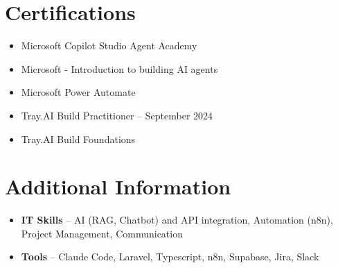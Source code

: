 \documentclass[a4paper,10pt]{article}
\begin{document}
\section{Certifications}
\begin{itemize}
\item Microsoft Copilot Studio Agent Academy
\item Microsoft - Introduction to building AI agents
\item Microsoft Power Automate
\item Tray.AI Build Practitioner -- September 2024
\item Tray.AI Build Foundations
\end{itemize}

\section{Additional Information}
\begin{itemize}
\item \textbf{IT Skills} -- AI (RAG, Chatbot) and API integration, Automation (n8n), Project Management, Communication
\item \textbf{Tools} -- Claude Code, Laravel, Typescript, n8n, Supabase, Jira, Slack
\end{itemize}
\end{document}
